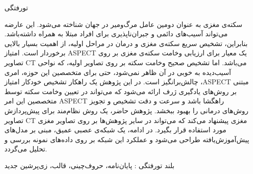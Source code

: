 


‌تورفتگی

سکته‌ی مغزی به عنوان دومین عامل مرگ‌و‌میر در جهان شناخته می‌شود.
این عارضه می‌تواند آسیب‌های دائمی و جبران‌ناپذیری برای افراد مبتلا به همراه داشته‌باشد.
بنابراین،
تشخیص سریع سکته‌ی مغزی و درمان در مراحل اولیه، از اهمیت بسیار بالایی برخوردار است.
امتیاز ASPECT یک معیار برای ارزیابی وخامت سکته‌ی مغزی بر روی تصاویر CT می‌باشد.
اما تشخیص صحیح وخامت سکته بر روی تصاویر اولیه، که نواحی آسیب‌دیده به خوبی در آن ظاهر نمی‌شود، حتی برای متخصصین این حوزه، امری چالش‌بر‌انگیز است.
 در این پژوهش 
یک راهکار تشخیص خودکار امتیاز ،ASPECT مبتنی بر روش‌های یادگیری ژرف ارائه می‌شود که می‌تواند
 در تعیین وخامت سکته توسط متخصصین این امر ASPECT راهگشا باشد و سرعت و دقت تشخیص و تجویز روش‌های درمانی را بهبود ببخشد.
پژوهش حاضر، یک روش نظام‌مند برای پیش‌پردازش تصاویر CT مغزی پیشنهاد می‌کند که می‌تواند در سایر پژوهش‌ها بر روی تصاویر مغزی مورد استفاده قرار بگیرد.
در ادامه، یک شبکه‌ی عصبی عمیق، مبنی بر مدل‌های پیش‌آموزش‌یافته طراحی می‌شود و  عملکرد این شبکه بر روی داده‌های نمونه بررسی و تحلیل می‌گردد.
 

‌بلند
‌تورفتگی : 
پایان‌نامه، حروف‌چینی، قالب، زی‌پرشین
‌جدید
